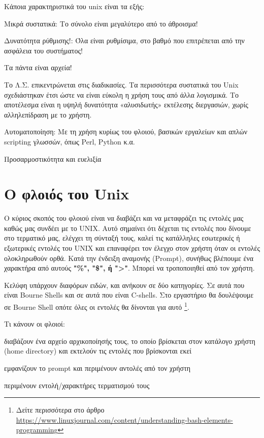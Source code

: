 Κάποια χαρακτηριστικά του unix είναι τα εξής:
\begin{packed_item}
\item Μικρά συστατικά: Το σύνολο είναι μεγαλύτερο από το άθροισμα!
\item Δυνατότητα ρύθμισης!: Όλα είναι ρυθμίσιμα, στο βαθμό που επιτρέπεται από την ασφάλεια του συστήματος!
\item Τα πάντα είναι αρχεία!
\item Το Λ.Σ. επικεντρώνεται στις διαδικασίες. Τα περισσότερα συστατικά του Unix σχεδιάστηκαν έτσι ώστε να είναι εύκολη η χρήση τους από άλλα λογισμικά. Το αποτέλεσμα είναι η υψηλή δυνατότητα «αλυσιδωτής» εκτέλεσης διεργασιών, χωρίς αλληλεπίδραση με το χρήστη.
\item Αυτοματοποίηση: Με τη χρήση κυρίως του φλοιού, βασικών εργαλείων και απλών scripting γλωσσών, όπως Perl, Python κ.α.
\item Προσαρμοστικότητα και ευελιξία
\end{packed_item}



\section{Ο φλοιός του Unix}

Ο κύριος σκοπός του φλοιού είναι να διαβάζει και να μεταφράζει τις εντολές μας καθώς μας συνδέει με το UΝΙΧ. Αυτό σημαίνει ότι δέχεται τις εντολές που δίνουμε στο τερματικό μας, ελέγχει τη σύνταξή τους, καλεί τις κατάλληλες εσωτερικές ή εξωτερικές εντολές του UΝΙΧ και επαναφέρει τον έλεγχο στον χρήστη όταν οι εντολές ολοκληρωθούν ορθά.
Κατά την ένδειξη αναμονής (Prompt), συνήθως βλέπουμε ένα χαρακτήρα από αυτούς \textbf{"\%", "\$", ή ">"}.
Μπορεί να τροποποιηθεί από τον χρήστη.

Κελύφη υπάρχουν διαφόρων ειδών, και ανήκουν σε δύο κατηγορίες. Σε αυτά που είναι Bourne Shells και σε αυτά που είναι C-shells. Στο εργαστήριο θα δουλέψουμε σε Bourne Shell οπότε όλες οι εντολές θα δίνονται για αυτό \footnote{Δείτε περισσότερα στο άρθρο \href{https://www.linuxjournal.com/content/understanding-bash-elements-programming}{https://www.linuxjournal.com/content/understanding-bash-elements-programming}}. 



Τι κάνουν οι φλοιοί:
\begin{packed_enum}
  \item διαβάζουν ένα αρχείο αρχικοποίησής τους, το οποίο βρίσκεται στον κατάλογο χρήστη (home directory) και εκτελούν τις εντολές που βρίσκονται εκεί
  \item εμφανίζουν το prompt και περιμένουν αντολές από τον χρήστη
  \item περιμένουν εντολή/χαρακτήρες τερματισμού τους
\end{packed_enum}

